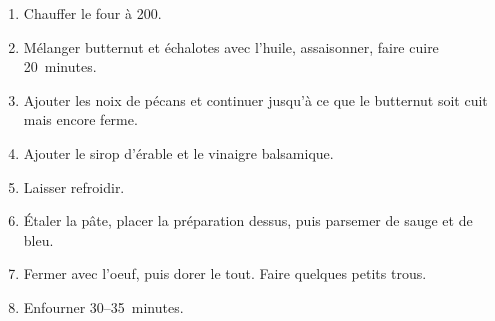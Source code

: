 
\begin{ingredients}
\end{ingredients}


\begin{recipe}
  \begin{enumerate}

  \item Chauffer le four à 200\degreeC.

  \item Mélanger butternut et échalotes avec l'huile, assaisonner,
    faire cuire 20~minutes.

  \item Ajouter les noix de pécans et continuer jusqu'à ce que le
    butternut soit cuit mais encore ferme.

  \item Ajouter le sirop d'érable et le vinaigre balsamique.

  \item Laisser refroidir.

  \item Étaler la pâte, placer la préparation dessus, puis parsemer de
    sauge et de bleu.

  \item Fermer avec l'oeuf, puis dorer le tout.  Faire quelques petits trous.

  \item Enfourner 30--35~minutes.

  \end{enumerate}
\end{recipe}

